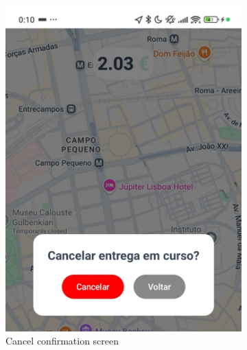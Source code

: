 \begin{figure}[H]
    \centering
    \begin{subfigure}[b]{0.47\textwidth}
        \centering
        \includegraphics[width=\textwidth]{images/CancelConfirmation.jpeg}
        \caption{Cancel confirmation screen}
        \label{fig:cancel_confirmation}
    \end{subfigure}
    \hfill
    \begin{subfigure}[b]{0.47\textwidth}
        \centering

\end{subfigure}
\end{figure}

